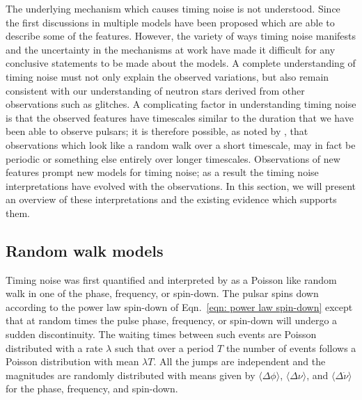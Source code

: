 The underlying mechanism which causes timing noise is not understood. Since the
first discussions in \citet{Boynton1972} multiple models have been proposed
which are able to describe some of the features. However, the variety of ways
timing noise manifests and the uncertainty in the mechanisms at work have made
it difficult for any conclusive statements to be made about the models. A
complete understanding of timing noise must not only explain the observed
variations, but also remain consistent with our understanding of neutron stars
derived from other observations such as glitches. A complicating factor in
understanding timing noise is that the observed features have timescales
similar to the duration that we have been able to observe pulsars; it is
therefore possible, as noted by \citet{Hobbs2010}, that observations which look
like a random walk over a short timescale, may in fact be periodic or something
else entirely over longer timescales.  Observations of new features prompt new
models for timing noise; as a result the timing noise interpretations have
evolved with the observations. In this section, we will present an overview of
these interpretations and the existing evidence which supports them.

\subsection{Random walk models}
\label{sec: TN interpretations random walk models}

Timing noise was first quantified and interpreted by \citet{Boynton1972} as a
Poisson like random walk in one of the phase, frequency, or spin-down. The
pulsar spins down according to the power law spin-down of Eqn.~\eqref{eqn:
power law spin-down} except that at random times the pulse phase, frequency, or
spin-down will undergo a sudden discontinuity. The waiting times between such events
are Poisson distributed with a rate $\lambda$ such that over a period $T$ the number of
events follows a Poisson distribution with mean $\lambda T$. All the jumps are
independent and the magnitudes are randomly distributed with means given by
$\langle\Delta\phi\rangle$, $\langle\Delta\nu\rangle$, and $\langle\Delta\dot{\nu}\rangle$ for the phase,
frequency, and spin-down.

